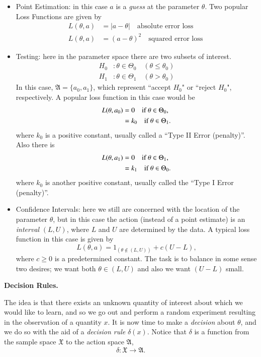\documentclass[captions=tableheading]{scrbook}
\begin{document}
\begin{itemize}
\item Point Estimation: in this case $a$ is a \emph{guess} at the parameter $\theta$. Two popular Loss Functions are given by 
   \begin{align*}
   L(\theta,a) & =|a-\theta|\quad\mbox{absolute error loss}\\
   L(\theta,a) & =(a-\theta)^{2}\quad\mbox{squared error loss }
   \end{align*}
\item Testing: here in the parameter space there are two subsets of interest.
   \begin{align*}
   H_{0} & :\theta\in\Theta_{0}\quad(\theta\leq\theta_{0})\\
   H_{1} & :\theta\in\Theta_{1}\quad(\theta>\theta_{0})
   \end{align*}
   In this case, $\mathfrak{A}=\{a_{0},a_{1}\}$, which represent ``accept $H_{0}$" or ``reject $H_{0}$", respectively. A popular loss function in this case would be 
   \begin{align*}
   L(\theta,a_{0}) & =0\quad\mbox{if \ensuremath{\theta\in\Theta_{0}},}\\
   & =k_{0}\quad\mbox{if \ensuremath{\theta\in\Theta_{1}}.}
   \end{align*}
   where $k_{0}$ is a positive constant, usually called a ``Type II Error (penalty)''. Also there is 
   \begin{align*}
   L(\theta,a_{1}) & =0\quad\mbox{if \ensuremath{\theta\in\Theta_{1}},}\\
 & =k_{1}\quad\mbox{if \ensuremath{\theta\in\Theta_{0}}.}
   \end{align*}
   where $k_{0}$ is another positive constant, usually called the ``Type I Error (penalty)''.
\item Confidence Intervals: here we still are concerned with the location of the parameter $\theta$, but in this case the action (instead of a point estimate) is an \emph{interval} $(L,U)$, where $L$ and $U$ are determined by the data. A typical loss function in this case is given by 
   \[
   L(\theta,a)=1_{(\theta\notin(L,U))}+c(U-L),
   \]
   where $c\geq0$ is a predetermined constant. The task is to balance in some sense two desires; we want both $\theta\in(L,U)$ and also we want $(U-L)$ small.
\end{itemize}

\textbf{Decision Rules.}

The idea is that there exists an unknown quantity of interest about which we would like to learn, and so we go out and perform a random experiment resulting in the observation of a quantity $x$. It is now time to make a \emph{decision} about $\theta$, and we do so with the aid of a \emph{decision rule} $\delta(x)$. Notice that $\delta$ is a function from the sample space $\mathfrak{X}$ to the action space
$\mathfrak{A}$, 
\[
\delta:\mathfrak{X}\to\mathfrak{A}.
\]
\end{document}
